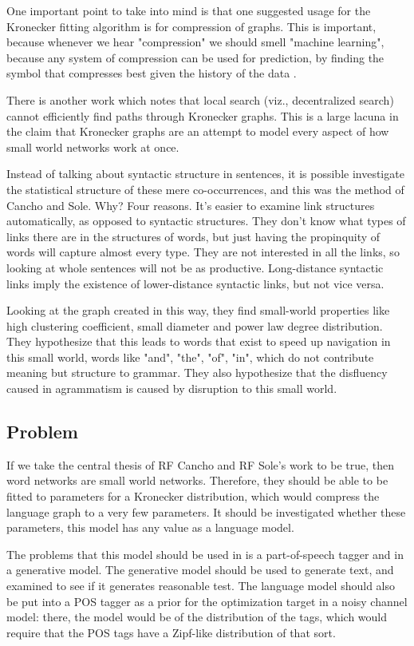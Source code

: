 \documentclass[12pt]{article}
\begin{document}
One important point to take into mind is that one suggested usage for the Kronecker fitting algorithm is for compression of graphs. This is important, because whenever we hear "compression" we should smell "machine learning", because any system of compression can be used for prediction, by finding the symbol that compresses best given the history of the data \cite{mlcompression}.

There is another work which notes that local search (viz., decentralized search) cannot efficiently find paths through Kronecker graphs. This is a large lacuna in the claim that Kronecker graphs are an attempt to model every aspect of how small world networks work at once\cite{stochkrongraph}.

Instead of talking about syntactic structure in sentences, it is possible investigate the statistical structure of these mere co-occurrences, and this was the method of Cancho and Sole. Why? Four reasons. It's easier to examine link structures automatically, as opposed to syntactic structures. They don't know what types of links there are in the structures of words, but just having the propinquity of words will capture almost every type. They are not interested in all the links, so looking at whole sentences will not be as productive. Long-distance syntactic links imply the existence of lower-distance syntactic links, but not vice versa.

Looking at the graph created in this way, they find small-world properties like high clustering coefficient, small diameter and power law degree distribution. They hypothesize that this leads to words that exist to speed up navigation in this small world, words like "and", "the", "of", "in", which do not contribute meaning but structure to grammar. They also hypothesize that the disfluency caused in agrammatism is caused by disruption to this small world.

\subsection{Problem}

If we take the central thesis of RF Cancho and RF Sole's work to be true, then word networks are small world networks. Therefore, they should be able to be fitted to parameters for a Kronecker distribution, which would compress the language graph to a very few parameters. It should be investigated whether these parameters, this model has any value as a language model.

The problems that this model should be used in is a part-of-speech tagger and in a generative model. The generative model should be used to generate text, and examined to see if it generates reasonable test. The language model should also be put into a POS tagger as a prior for the optimization target in a noisy channel model: there, the model would be of the distribution of the tags, which would require that the POS tags have a Zipf-like distribution of that sort. \cite{collins}
\end{document}
